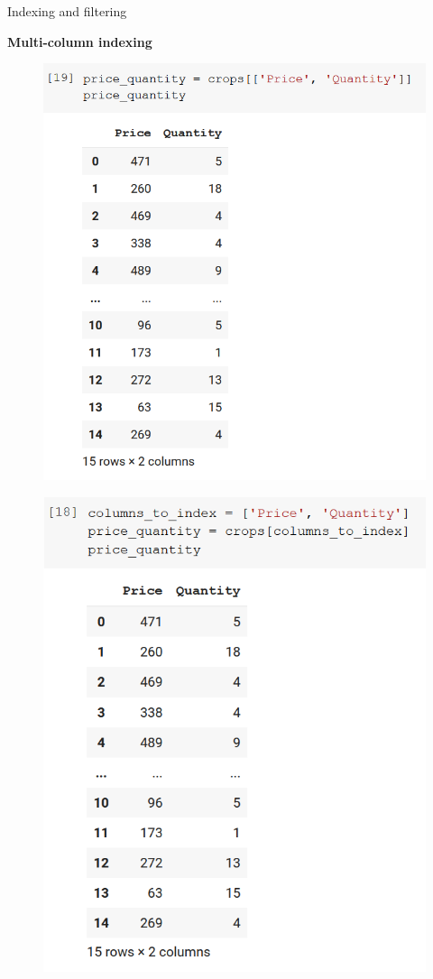 \documentclass[aspectratio=169]{beamer}
\begin{document}
\begin{frame}{Indexing and filtering}

	\textbf{Multi-column indexing}

	\begin{multicols}{2}

		\begin{figure}
			\centering
			\includegraphics[width=0.8\linewidth]{img/multicol_subsetting1.png}
		\end{figure}
		\begin{figure}
			\centering
			\includegraphics[width=0.75\linewidth]{img/multicol_subsetting2.png}
		\end{figure}

	\end{multicols}

\end{frame}
\end{document}
